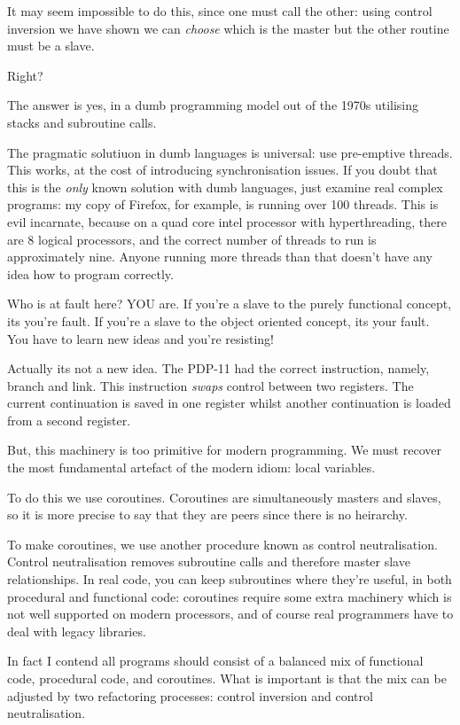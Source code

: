 \documentclass{article}
\begin{document}
It may seem impossible to do this, since one must call the
other: using control inversion we have shown we can {\em choose}
which is the master but the other routine must be a slave.

Right?

The answer is yes, in a dumb programming model out of the 1970s
utilising stacks and subroutine calls.

The pragmatic solutiuon in dumb languages is universal: use 
pre-emptive threads. This works, at the cost of introducing
synchronisation issues. If you doubt that this is the {\em only}
known solution with dumb languages, just examine real complex
programs: my copy of Firefox, for example, is running over 100
threads. This is evil incarnate, because on a quad core intel processor
with hyperthreading, there are 8 logical processors, and the correct
number of threads to run is approximately nine. Anyone running more
threads than that doesn't have any idea how to program correctly.

Who is at fault here? YOU are. If you're a slave to the purely
functional concept, its you're fault. If you're a slave to the
object oriented concept, its your fault. You have to learn new
ideas and you're resisting!

Actually its not a new idea. The PDP-11 had the correct instruction,
namely, branch and link. This instruction {\em swaps} control between
two registers. The current continuation is saved in one register whilst
another continuation is loaded from a second register.

But, this machinery is too primitive for modern programming.
We must recover the most fundamental artefact of the modern
idiom: local variables. 

To do this we use coroutines. Coroutines are simultaneously masters and slaves,
so it is more precise to say that they are peers since there is no heirarchy.

To make coroutines, we use another procedure known as control neutralisation.
Control neutralisation removes subroutine calls and therefore master
slave relationships. In real code, you can keep subroutines where they're
useful, in both procedural and functional code: coroutines require some
extra machinery which is not well supported on modern processors, and of course
real programmers have to deal with legacy libraries.

In fact I contend all programs should consist of a balanced mix of 
functional code, procedural code, and coroutines. What is important
is that the mix can be adjusted by two refactoring processes:
control inversion and control neutralisation.
\end{document}
